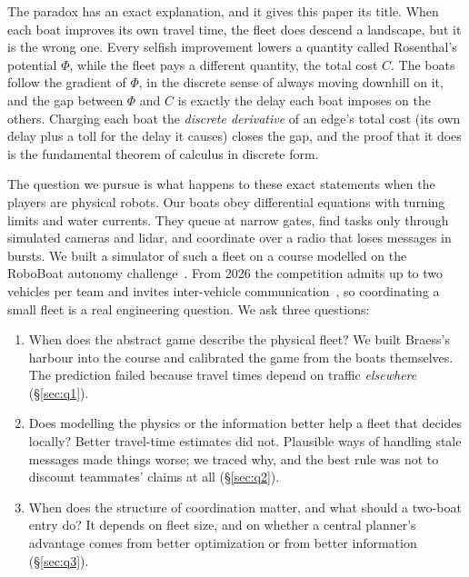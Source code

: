 \documentclass[11pt]{article}
\theoremstyle{definition}
\begin{document}
The paradox has an exact explanation, and it gives this paper its title. When each boat improves its own travel time, the fleet does descend a landscape, but it is the wrong one. Every selfish improvement lowers a quantity called Rosenthal's potential $\Phi$, while the fleet pays a different quantity, the total cost $C$. The boats follow the gradient of $\Phi$, in the discrete sense of always moving downhill on it, and the gap between $\Phi$ and $C$ is exactly the delay each boat imposes on the others. Charging each boat the \emph{discrete derivative} of an edge's total cost (its own delay plus a toll for the delay it causes) closes the gap, and the proof that it does is the fundamental theorem of calculus in discrete form.

The question we pursue is what happens to these exact statements when the players are physical robots. Our boats obey differential equations with turning limits and water currents. They queue at narrow gates, find tasks only through simulated cameras and lidar, and coordinate over a radio that loses messages in bursts. We built a simulator of such a fleet on a course modelled on the RoboBoat autonomy challenge~\cite{robonation2025}. From 2026 the competition admits up to two vehicles per team and invites inter-vehicle communication~\cite{robonation2026}, so coordinating a small fleet is a real engineering question. We ask three questions:
\begin{enumerate}
\item When does the abstract game describe the physical fleet? We built Braess's harbour into the course and calibrated the game from the boats themselves. The prediction failed because travel times depend on traffic \emph{elsewhere} (\S\ref{sec:q1}).
\item Does modelling the physics or the information better help a fleet that decides locally? Better travel-time estimates did not. Plausible ways of handling stale messages made things worse; we traced why, and the best rule was not to discount teammates' claims at all (\S\ref{sec:q2}).
\item When does the structure of coordination matter, and what should a two-boat entry do? It depends on fleet size, and on whether a central planner's advantage comes from better optimization or from better information (\S\ref{sec:q3}).
\end{enumerate}
\end{document}

